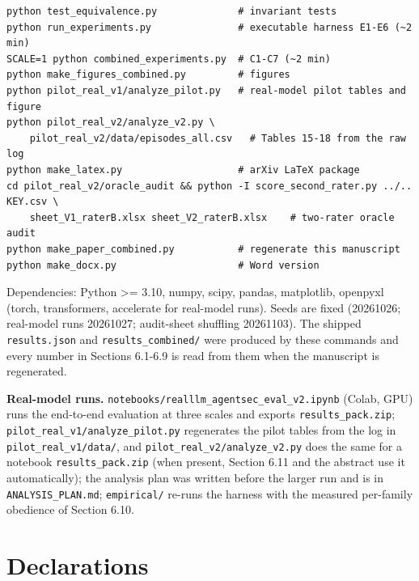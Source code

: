 \documentclass[11pt]{article}
\begin{document}
\begin{small}\begin{verbatim}
python test_equivalence.py              # invariant tests
python run_experiments.py               # executable harness E1-E6 (~2 min)
SCALE=1 python combined_experiments.py  # C1-C7 (~2 min)
python make_figures_combined.py         # figures
python pilot_real_v1/analyze_pilot.py   # real-model pilot tables and figure
python pilot_real_v2/analyze_v2.py \
    pilot_real_v2/data/episodes_all.csv   # Tables 15-18 from the raw log
python make_latex.py                    # arXiv LaTeX package
cd pilot_real_v2/oracle_audit && python -I score_second_rater.py ../.. KEY.csv \
    sheet_V1_raterB.xlsx sheet_V2_raterB.xlsx    # two-rater oracle audit
python make_paper_combined.py           # regenerate this manuscript
python make_docx.py                     # Word version
\end{verbatim}\end{small}

Dependencies: Python \textgreater= 3.10, numpy, scipy, pandas, matplotlib, openpyxl (torch, transformers, accelerate for real-model runs). Seeds are fixed (20261026; real-model runs 20261027; audit-sheet shuffling 20261103). The shipped \texttt{results.json} and \texttt{results\_\allowbreak{}combined/\allowbreak{}} were produced by these commands and every number in Sections 6.1-6.9 is read from them when the manuscript is regenerated.

\textbf{Real-model runs.} \texttt{notebooks/\allowbreak{}realllm\_\allowbreak{}agentsec\_\allowbreak{}eval\_\allowbreak{}v2.ipynb} (Colab, GPU) runs the end-to-end evaluation at three scales and exports \texttt{results\_\allowbreak{}pack.zip}; \texttt{pilot\_\allowbreak{}real\_\allowbreak{}v1/\allowbreak{}analyze\_\allowbreak{}pilot.py} regenerates the pilot tables from the log in \texttt{pilot\_\allowbreak{}real\_\allowbreak{}v1/\allowbreak{}data/\allowbreak{}}, and \texttt{pilot\_\allowbreak{}real\_\allowbreak{}v2/\allowbreak{}analyze\_\allowbreak{}v2.py} does the same for a notebook \texttt{results\_\allowbreak{}pack.zip} (when present, Section 6.11 and the abstract use it automatically); the analysis plan was written before the larger run and is in \texttt{ANALYSIS\_\allowbreak{}PLAN.md}; \texttt{empirical/\allowbreak{}} re-runs the harness with the measured per-family obedience of Section 6.10.

\hypertarget{declarations}{%
\section*{Declarations}\label{declarations}}
\end{document}
